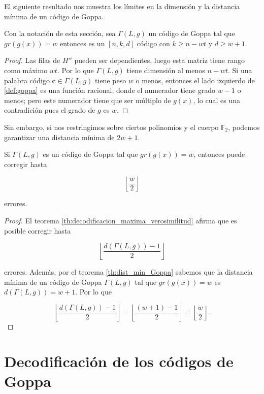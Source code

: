 El siguiente resultado nos muestra los límites en la dimensión y la distancia mínima de un código de Goppa.

\begin{theorem}
    \label{th:dist_min_Goppa}
    Con la notación de esta sección, sea $\Gamma(L,g)$ un código de Goppa tal que $gr(g(x)) = w$ entonces es un $[n, k, d]$ código con $k \geq n - wt$ y $d \geq w + 1$.
\end{theorem}

\begin{proof}
    Las filas de $H''$ pueden ser dependientes, luego esta matriz tiene rango como máximo $wt$. Por lo que $\Gamma(L,g)$ tiene dimensión al menos $n - wt$. Si una palabra código $\textbf{c} \in \Gamma(L,g)$ tiene peso $w$ o menos, entonces el lado izquierdo de \ref{def:goppa} es una función racional, donde el numerador tiene grado $w - 1$ o menos; pero este numerador tiene que ser múltiplo de $g(x)$, lo cual es una contradición pues el grado de $g$ es $w$.
\end{proof}

Sin embargo, si nos restringimos sobre ciertos polinomios y el cuerpo $\mathbb{F}_2$, podemos garantizar una distancia mínima de $2w + 1$.

\begin{corollary}
    Si $\Gamma(L,g)$ es un código de Goppa tal que $gr(g(x)) = w$, entonces puede corregir hasta

    $$\left\lfloor \frac{w}{2} \right\rfloor $$

    errores.
\end{corollary}

\begin{proof}
    El teorema \ref{th:decodificacion_maxima_verosimilitud} afirma que es posible corregir hasta 
    
    $$\left\lfloor \frac{d(\Gamma(L,g)) - 1}{2} \right\rfloor$$

    errores. Además, por el teorema \ref{th:dist_min_Goppa} sabemos que la distancia mínima de un código de Goppa $\Gamma(L,g)$ tal que $gr(g(x)) = w$ es $d(\Gamma(L,g)) = w + 1$. Por lo que

    $$\left\lfloor \frac{d(\Gamma(L,g)) - 1}{2} \right\rfloor = \left\lfloor \frac{(w + 1) - 1}{2} \right\rfloor = \left\lfloor \frac{w}{2} \right\rfloor .$$
\end{proof}

\section{Decodificación de los códigos de Goppa}

